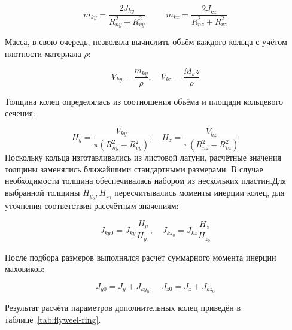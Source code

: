 \begin{equation}
	\label{eq:flyweel_mass}
	m_{ky}=\frac{2J_{ky}}{R_{ny}^2+R_{vy}^2}, \quad \quad m_{kz}=\frac{2J_{kz}}{R_{nz}^2+R_{vz}^2}
\end{equation}

Масса, в свою очередь, позволяла вычислить объём каждого кольца с учётом плотности материала $\rho$:

\begin{equation}
	\label{eq:flyweel_volume}
	V_{ky} = \frac{m_{ky}}{\rho}, \quad V_{kz}=\frac{M_kz}{\rho}
	\end{equation}
	
	
Толщина колец определялась из соотношения объёма и площади кольцевого сечения:

\begin{equation}
	\label{eq:flywell_thickness}
	H_y=\frac{V_{ky}}{\pi(R_{ny}^2-R_{vy}^2)}, \quad H_z=\frac{V_{kz}}{\pi(R_{nz}^2-R_{vz}^2)}
	\end{equation}
Поскольку кольца изготавливались из листовой латуни, расчётные значения толщины заменялись ближайшими стандартными размерами. В случае необходимости толщина обеспечивалась набором из нескольких пластин.Для выбранной толщины $H_{y_{0}}, H_{z_{0}}$ пересчитывались моменты инерции колец, для уточнения соответствия рассчётным значениям:

\begin{equation}
	\label{eq:final_ring_inertia}
	J_{ky0}=J_{ky}\frac{H_y}{H_{y_{0}}}, \quad J_{kz_{0}}=J_{kz}\frac{H_z}{H_{z_{0}}}
	\end{equation}
	
После подбора размеров выполнялся расчёт суммарного момента инерции маховиков:

\begin{equation}
	\label{eq:flyweel_sum_inertia}
	J_{y0}=J_y+J_{ky_{0}}, \quad J_{z0}=J_{z}+J_{kz_{0}}
\end{equation}

Результат расчёта параметров дополнительных колец приведён в таблице~\cref{tab:flyweel-ring}.




